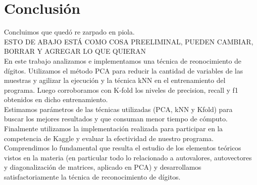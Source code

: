 \section{Conclusión}

Concluimos que quedó re zarpado en piola.\\



ESTO DE ABAJO ESTÁ COMO COSA PREELIMINAL, PUEDEN CAMBIAR, BORRAR Y AGREGAR LO QUE QUIERAN\\


En este trabajo analizamos e implementamos una técnica de reonocimiento de dígitos. Utilizamos el método PCA para reducir la cantidad de variables de las muestras y agilizar la ejecución y la técnica kNN en el entrenamiento del programa. Luego corroboramos con K-fold los niveles de precision, recall y f1 obtenidos en dicho entrenamiento.\\

Estimamos parámetros de las técnicas utilizadas (PCA, kNN y Kfold) para buscar los mejores resultados y que consuman menor tiempo de cómputo.\\

Finalmente utilizamos la implementación realizada para participar en la competencia de Kaggle y evaluar la efectividad de nuestro programa.\\

Comprendimos lo fundamental que resulta el estudio de los elementos teóricos vistos en la materia (en particular todo lo relacionado a autovalores, autovectores y diagonalización de matrices, aplicado en PCA) y desarrollamos satisfactoriamente la técnica de reconocimiento de dígitos.